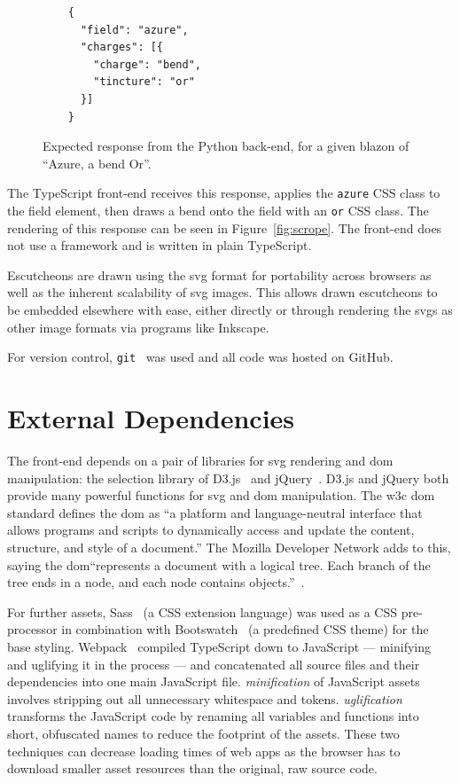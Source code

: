 \documentclass[nobib, a4paper, twoside, justified]{tufte-book}
\makeatletter
\newcommand{\svg}{\gls{svg}\@\xspace}
\newcommand{\svgs}{\glspl{svg}\@\xspace}
\newcommand{\dom}{\gls{dom}\@\xspace}
\newcommand{\blazon}{\gls{blazon}\@\xspace}
\makeatother
\begin{document}
\begin{figure}[h]
  \begin{verbatim}
    {
      "field": "azure",
      "charges": [{
        "charge": "bend",
        "tincture": "or"
      }]
    }
  \end{verbatim}
  \caption{Expected response from the Python back-end, for a given \blazon of ``Azure, a bend Or''.}%
  \label{fig:expected_output}
\end{figure}

\pagebreak%

The TypeScript front-end receives this response, applies the \texttt{azure} CSS class to the field
element, then draws a bend onto the field with an \texttt{or} CSS class. The rendering of this
response can be seen in Figure~\ref{fig:scrope}. The front-end does not use a framework and is
written in plain TypeScript.

Escutcheons are drawn using the \svg format for portability across browsers as well as the inherent
scalability of \svg images. This allows drawn escutcheons to be embedded elsewhere with ease,
either directly or through rendering the \svgs as other image formats via programs like Inkscape.

For version control, \texttt{git}~\autocite{git} was used and all code was hosted on GitHub.

\section{External Dependencies}%
\label{sec:external_dependencies}

The front-end depends on a pair of libraries for \svg rendering and \dom manipulation: the
selection library of D3.js~\autocite{d3js} and jQuery~\autocite{jquery}. D3.js and jQuery both
provide many powerful functions for \svg and \dom manipulation.  The \gls{w3c} \dom standard
defines the \dom as ``a platform and language-neutral interface that allows programs and scripts to
dynamically access and update the content, structure, and style of a document.'' The Mozilla
Developer Network adds to this, saying the \dom ``represents a document with a logical tree. Each
branch of the tree ends in a node, and each node contains objects.''~\autocite{mdn_dom}.

For further assets, Sass~\autocite{sass-lang} (a CSS extension language) was used as a CSS
pre-processor in combination with Bootswatch~\autocite{bootswatch-flatly} (a predefined CSS theme)
for the base styling. Webpack~\autocite{webpack} compiled TypeScript down to JavaScript ---
minifying and uglifying it in the process --- and concatenated all source files and their
dependencies into one main JavaScript file. \textit{\Gls{minification}} of JavaScript assets
involves stripping out all unnecessary whitespace and tokens.  \textit{\Gls{uglification}}
transforms the JavaScript code by renaming all variables and functions into short, obfuscated names
to reduce the footprint of the assets. These two techniques can decrease loading times of web apps
as the browser has to download smaller asset resources than the original, raw source code.
\end{document}

